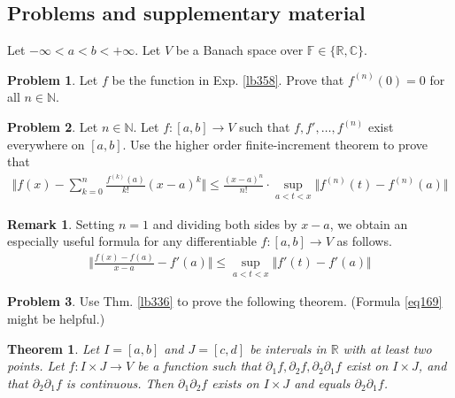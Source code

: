 \documentclass[12pt,b5paper,notitlepage]{article}
\theoremstyle{definition}
\newtheorem{rem}[df]{Remark}
\newtheorem{prob}{\color{red}Problem}[section]
\theoremstyle{plain}
\newtheorem{thm}[df]{Theorem}
\newcommand{\Cbb}{\mathbb C}
\newcommand{\Nbb}{\mathbb N}
\newcommand{\Rbb}{\mathbb R}
\newcommand{\Fbb}{\mathbb F}
\numberwithin{equation}{section}
\begin{document}
\subsection{Problems and supplementary material}


Let $-\infty<a<b<+\infty$. Let $V$ be a Banach space over $\Fbb\in\{\Rbb,\Cbb\}$.


\begin{prob}
Let $f$ be the function in Exp. \ref{lb358}. Prove that $f^{(n)}(0)=0$ for all $n\in\Nbb$.
\end{prob}




\begin{prob}\label{lb361}
Let $n\in\Nbb$. Let $f:[a,b]\rightarrow V$ such that $f,f',\dots,f^{(n)}$ exist everywhere on $[a,b]$. Use the higher order finite-increment theorem to prove that
\begin{align}
\Big\Vert f(x)-\sum_{k=0}^n\frac{f^{(k)}(a)}{k!}(x-a)^k\Big\Vert\leq \frac{(x-a)^{n}}{n!}\cdot \sup_{a<t<x}\Vert f^{(n)}(t)-f^{(n)}(a)\Vert  \label{eq174}
\end{align}
\end{prob}

\begin{rem}\label{lb404}
Setting $n=1$ and dividing both sides by $x-a$, we obtain an especially useful formula for any differentiable $f:[a,b]\rightarrow V$ as follows.
\begin{align}
\Big\Vert \frac{f(x)-f(a)}{x-a}-f'(a)\Big\Vert\leq \sup_{a<t<x}
\big\Vert f'(t)-f'(a)\big\Vert  \label{eq169}
\end{align}
\end{rem}


\begin{prob}
Use Thm. \ref{lb336} to prove the following theorem. (Formula \eqref{eq169} might be helpful.)
\end{prob}



\begin{thm}\label{lb406}
Let $I=[a,b]$ and $J=[c,d]$ be intervals in $\Rbb$ with at least two points. Let $f:I\times J\rightarrow V$ be a function such that $\partial_1f,\partial_2f,\partial_2\partial_1f$ exist on $I\times J$, and that $\partial_2\partial_1f$ is continuous. Then $\partial_1\partial_2f$ exists on $I\times J$ and equals $\partial_2\partial_1f$.
\end{thm}
\end{document}
